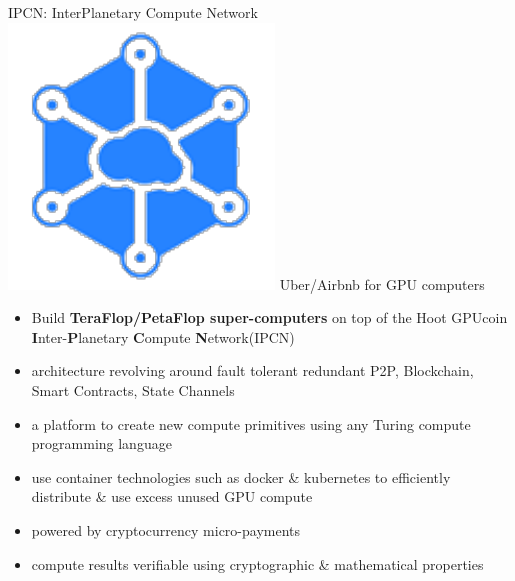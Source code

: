 \begin{frame}[t]{IPCN: InterPlanetary Compute Network}
	\includegraphics[scale=.3]{static/ipcn-p2p}
	 Uber/Airbnb for GPU computers
 \begin{itemize}
 \item Build \textbf{TeraFlop/PetaFlop super-computers} on top of the  Hoot GPUcoin \textbf{I}nter-\textbf{P}lanetary \textbf{C}ompute \textbf{N}etwork(IPCN)
 \item architecture revolving around fault tolerant redundant P2P, Blockchain, Smart Contracts, State Channels
 \item a platform to create new compute primitives using any Turing compute programming language
 \item use container technologies such as docker \& kubernetes to efficiently distribute \& use excess unused GPU compute
 \item powered by cryptocurrency micro-payments
 \item compute results verifiable using cryptographic \& mathematical properties
 \end{itemize}
\end{frame}